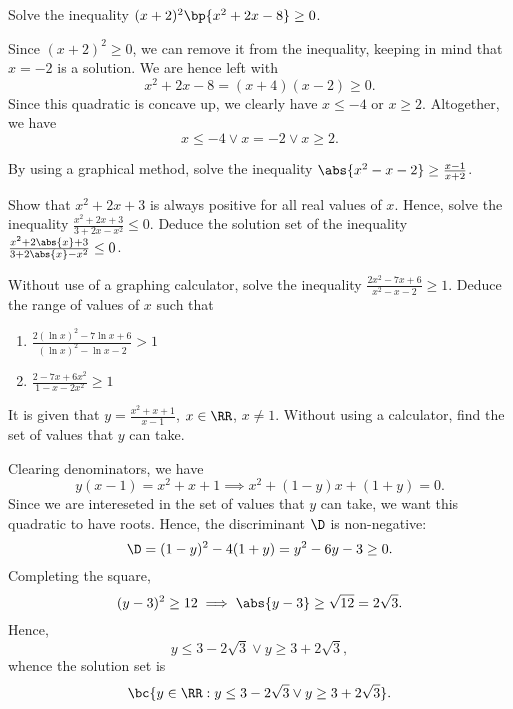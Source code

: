 \clearpage
\begin{problem}
    Solve the inequality $(x + 2)^2 \bp{x^2 + 2x - 8} \geq 0$.
\end{problem}
\begin{solution}
    Since $(x+2)^2 \geq 0$, we can remove it from the inequality, keeping in mind that $x = -2$ is a solution. We are hence left with \[x^2 + 2x - 8 = (x+4)(x-2) \geq 0.\] Since this quadratic is concave up, we clearly have $x \leq -4$ or $x \geq 2$. Altogether, we have \[x \leq -4 \lor x = -2 \lor x \geq 2.\]
\end{solution}

\begin{problem}
    By using a graphical method, solve the inequality $\abs{x^2 - x - 2} \geq \frac{x-1}{x+2}$.
\end{problem}

\begin{problem}
    Show that $x^2 + 2x + 3$ is always positive for all real values of $x$. Hence, solve the inequality $\frac{x^2 + 2x + 3}{3 + 2x - x^2} \leq 0$. Deduce the solution set of the inequality $\frac{x^2 + 2\abs{x} + 3}{3 + 2\abs{x} - x^2} \leq 0$.
\end{problem}

\begin{problem}
    Without use of a graphing calculator, solve the inequality $\frac{2x^2 - 7x + 6}{x^2 - x - 2} \geq 1$. Deduce the range of values of $x$ such that
    \begin{enumerate}
        \item $\frac{2(\ln x)^2 - 7\ln x + 6}{(\ln x)^2 - \ln x - 2} > 1$
        \item $\frac{2 - 7x + 6x^2}{1 - x - 2x^2} \geq 1$
    \end{enumerate}
\end{problem}

\begin{problem}
    It is given that $y = \frac{x^2 + x + 1}{x - 1}$, $x \in \RR$, $x \neq 1$. Without using a calculator, find the set of values that $y$ can take.
\end{problem}
\begin{solution}
    Clearing denominators, we have \[y(x-1) = x^2 + x + 1 \implies x^2 + (1-y)x + (1+y) = 0.\] Since we are intereseted in the set of values that $y$ can take, we want this quadratic to have roots. Hence, the discriminant $\D$ is non-negative: \[\D = (1-y)^2 - 4(1 + y) = y^2 - 6y - 3 \geq 0.\] Completing the square, \[(y-3)^2 \geq 12 \implies \abs{y - 3} \geq \sqrt{12} = 2\sqrt3.\] Hence, \[y \leq 3 - 2\sqrt3 \lor y \geq 3 + 2\sqrt3,\] whence the solution set is \[\bc{y \in \RR: y \leq 3 - 2\sqrt3 \lor y \geq 3 + 2\sqrt3}.\]
\end{solution}

